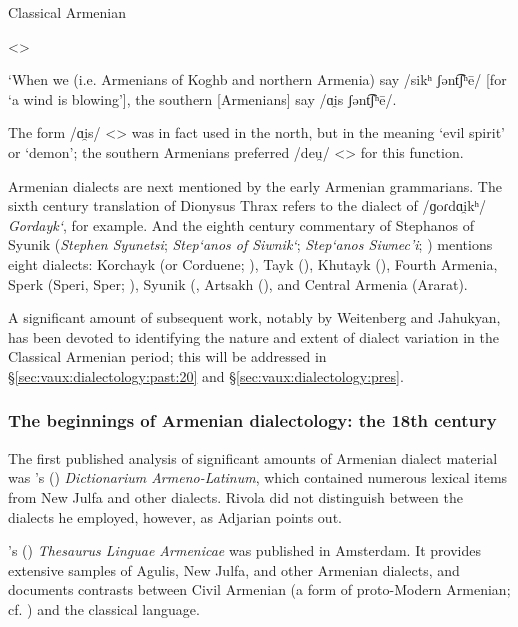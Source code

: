 \documentclass[output=paper]{langscibook}
\begin{document}
\begin{exe}
	\ex Classical Armenian \label{vaux:CA:sentence} 
	 
    <> 

    
    	`When we (i.e. Armenians of Koghb and northern Armenia) say /sikʰ ʃənt͡ʃʰē/ [for `a wind is blowing'], the southern [Armenians] say /ɑi̯s ʃənt͡ʃʰē/.
	
\end{exe}


The form   /ɑi̯s/ <>  was in fact used in the north, but in the meaning `evil spirit' or `demon'; the southern Armenians preferred   /deu̯/ <>  for this function.	

Armenian dialects are next mentioned by the early Armenian grammarians. The sixth century translation of Dionysus Thrax refers to the dialect of  /ɡoɾdɑi̯kʰ/ \textit{Gordayk‘}, for example. And the eighth century commentary of  Stephanos of Syunik  (\textit{Stephen Syunetsi}; \textit{Step‘anos of Siwnik‘}; \textit{Step‘anos Siwnec'i}; ) mentions eight dialects: Korchayk (or Corduene; ), Tayk (), Khutayk (), Fourth Armenia, Sperk (Speri,  Sper; ), Syunik (, Artsakh (), and Central Armenia (Ararat). 


A significant amount of subsequent work, notably by Weitenberg and Jahukyan, has been devoted to identifying the nature and extent of dialect variation in the Classical Armenian period; this will be addressed in \S\ref{sec:vaux:dialectology:past:20} and \S\ref{sec:vaux:dialectology:pres}. 

\subsubsection{The beginnings of Armenian dialectology: the 18th century}\label{sec:vaux:dialectology:past:18}

 
 The first published analysis of significant amounts of Armenian dialect material was  \citeauthor{Rivola-1633-DictionariumArmenoLatinum}'s (\citeyear{Rivola-1633-DictionariumArmenoLatinum})  \textit{Dictionarium Armeno-Latinum}, which contained numerous lexical items from New Julfa and other dialects. Rivola did not distinguish between the dialects he employed, however, as Adjarian \citep{Adjarian-1940-NewJulfaDialect} points out.	

\citeauthor{Shroder-1711-TheasauresArmenian}'s   (\citeyear{Shroder-1711-TheasauresArmenian}) \textit{Thesaurus Linguae Armenicae} was published in Amsterdam. It provides extensive samples of Agulis, New Julfa, and other Armenian dialects, and documents contrasts between Civil Armenian (a form of proto-Modern Armenian; cf. \citealt{Parnassian-1985-FormationAshkharabar}) and the classical language. 
\end{document}
